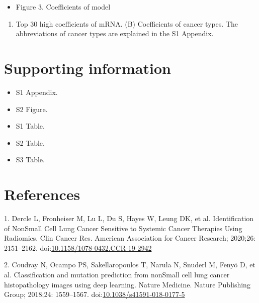 \documentclass[10pt,letterpaper]{article}
\providecommand{\tightlist}{%
  \setlength{\itemsep}{0pt}\setlength{\parskip}{0pt}}
\begin{document}
\begin{itemize}
\tightlist
\item
  Figure 3. Coefficients of model
\end{itemize}

\begin{enumerate}
\def\labelenumi{(\Alph{enumi})}
\tightlist
\item
  Top 30 high coefficients of mRNA. (B) Coefficients of cancer types.
  The abbreviations of cancer types are explained in the S1 Appendix.
\end{enumerate}

\hypertarget{supporting-information}{%
\section{Supporting information}\label{supporting-information}}

\begin{itemize}
\tightlist
\item
  S1 Appendix.\\
\item
  S2 Figure.\\
\item
  S1 Table.\\
\item
  S2 Table.\\
\item
  S3 Table.
\end{itemize}

\hypertarget{references}{%
\section*{References}\label{references}}

\hypertarget{refs}{}
\leavevmode\hypertarget{ref-dercleIdentificationNonSmall2020}{}%
1. Dercle L, Fronheiser M, Lu L, Du S, Hayes W, Leung DK, et al.
Identification of NonSmall Cell Lung Cancer Sensitive to Systemic Cancer
Therapies Using Radiomics. Clin Cancer Res. American Association for
Cancer Research; 2020;26: 2151--2162.
doi:\href{https://doi.org/10.1158/1078-0432.CCR-19-2942}{10.1158/1078-0432.CCR-19-2942}

\leavevmode\hypertarget{ref-coudrayClassificationMutationPrediction2018}{}%
2. Coudray N, Ocampo PS, Sakellaropoulos T, Narula N, Snuderl M, Fenyö
D, et al. Classification and mutation prediction from nonSmall cell lung
cancer histopathology images using deep learning. Nature Medicine.
Nature Publishing Group; 2018;24: 1559--1567.
doi:\href{https://doi.org/10.1038/s41591-018-0177-5}{10.1038/s41591-018-0177-5}
\end{document}
